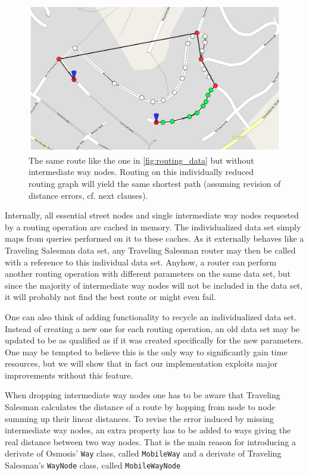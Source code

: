 \begin{enumerate}
\begin{figure}[h!]
	\centering
	\includegraphics[width=12cm]{pics/routing_data_2.png}
	\caption{The same route like the one in \ref{fig:routing_data} but without intermediate way nodes. Routing on this individually reduced routing graph will yield the same shortest path (assuming revision of distance errors, cf. next clauses).}
	\label{fig:routing_data_2}
\end{figure}

Internally, all essential street nodes and single intermediate way nodes requested by a routing operation are cached in memory. The individualized data set simply maps from queries performed on it to these caches. As it externally behaves like a Traveling Salesman data set, any Traveling Salesman router may then be called with a reference to this individual data set. Anyhow, a router can perform another routing operation with different parameters on the same data set, but since the majority of intermediate way nodes will not be included in the data set, it will probably not find the best route or might even fail.\newline

One can also think of adding functionality to recycle an individualized data set. Instead of creating a new one for each routing operation, an old data set may be updated to be as qualified as if it was created specifically for the new parameters. One may be tempted to believe this is the only way to significantly gain time resources, but we will show that in fact our implementation exploits major improvements without this feature.\newline

When dropping intermediate way nodes one has to be aware that Traveling Salesman calculates the distance of a route by hopping from node to node summing up their linear distances. To revise the error induced by missing intermediate way nodes, an extra property has to be added to ways giving the real distance between two way nodes. That is the main reason for introducing a derivate of Osmosis' \texttt{Way} class, called \texttt{MobileWay} and  a derivate of Traveling Salesman's \texttt{WayNode} class, called \texttt{MobileWayNode}


\end{enumerate}
